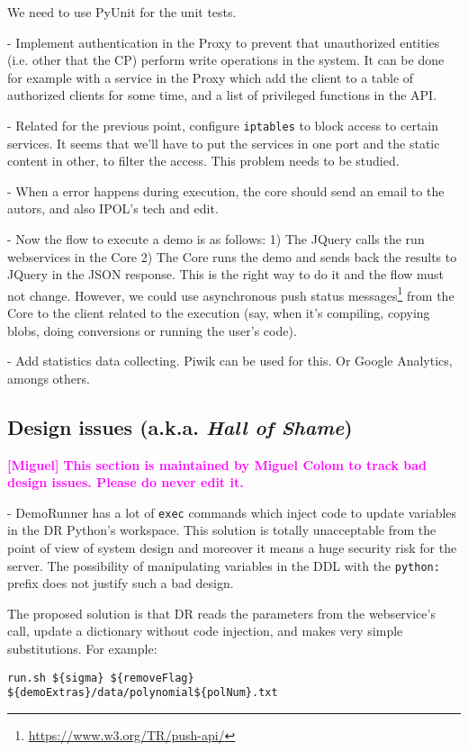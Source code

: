 \documentclass[a4paper,12pt]{article}
\newcommand{\miguel}[1]{\textcolor{magenta}{\textbf{[Miguel]} \textbf{#1}}}
\begin{document}
We need to use PyUnit for the unit tests.

- Implement authentication in the Proxy to prevent that unauthorized entities (i.e. other that the CP) perform write operations in the system. It can be done for example with a service in the Proxy which add the client to a table of authorized clients for some time, and a list of privileged functions in the API.

- Related for the previous point, configure {\tt iptables} to block access to certain services. It seems that we'll have to put the services in one port and the static content in other, to filter the access. This problem needs to be studied.

- When a error happens during execution, the core should send an email to the autors, and also IPOL's tech and edit.

- Now the flow to execute a demo is as follows: 1) The JQuery calls the run webservices in the Core 2) The Core runs the demo and sends back the results to JQuery in the JSON response. This is the right way to do it and the flow must not change. However, we could use asynchronous push status messages\footnote{\url{https://www.w3.org/TR/push-api/}} from the Core to the client related to the execution (say, when it's compiling, copying blobs, doing conversions or running the user's code). 

- Add statistics data collecting. Piwik can be used for this. Or Google Analytics, amongs others.


\subsection{Design issues (a.k.a. \emph{Hall of Shame})}
\miguel{This section is maintained by Miguel Colom to track bad design issues. Please do never edit it.}


- DemoRunner has a lot of {\tt exec} commands which inject code to update variables in the DR Python's workspace. This solution is totally unacceptable from the point of view of system design and moreover it means a huge security risk for the server. The possibility of manipulating variables in the DDL with the {\tt python: } prefix does not justify such a bad design.

The proposed solution is that DR reads the parameters from the webservice's call, update a dictionary without code injection, and makes very simple substitutions. For example:

\begin{verbatim}
run.sh ${sigma} ${removeFlag} ${demoExtras}/data/polynomial${polNum}.txt
\end{verbatim}
\end{document}
